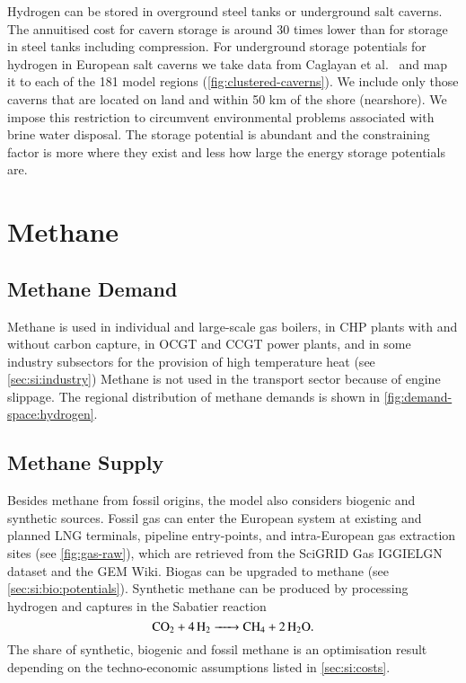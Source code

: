 Hydrogen can be stored in overground steel tanks or underground salt caverns.
The annuitised cost for cavern storage is around 30 times lower than for storage
in steel tanks including compression. For underground storage potentials for
hydrogen in European salt caverns we take data from Caglayan et
al.~ and map it to
each of the 181 model regions (\cref{fig:clustered-caverns}). We include only
those caverns that are located on land and within 50 km of the shore
(nearshore). We impose this restriction to circumvent environmental problems
associated with brine water disposal. The
storage potential is abundant and the constraining factor is more where they
exist and less how large the energy storage potentials are.

\section{Methane}
\label{sec:si:methane}

\subsection{Methane Demand}
\label{sec:si:methane:demand}

Methane is used in individual and large-scale gas boilers, in CHP plants with
and without carbon capture, in OCGT and CCGT power plants, and in some industry
subsectors for the provision of high temperature heat (see
\cref{sec:si:industry}) Methane is not used in the transport sector because of
engine slippage. The regional distribution of methane demands is shown in
\cref{fig:demand-space:hydrogen}. %

\subsection{Methane Supply}
\label{sec:si:methane:supply}

Besides methane from fossil origins, the model also considers biogenic and
synthetic sources. Fossil gas can enter the European system at existing and
planned LNG terminals, pipeline entry-points, and intra-European gas extraction
sites (see \cref{fig:gas-raw}), which are retrieved from the SciGRID Gas
IGGIELGN dataset and the GEM
Wiki. Biogas can be upgraded to methane (see
\cref{sec:si:bio:potentials}). Synthetic methane can be produced by processing
hydrogen and captures \co in the Sabatier reaction
\begin{equation}
    \ce{CO2 + 4H2 -> CH4 + 2H2O}.
\end{equation}
The share of synthetic, biogenic and fossil methane is an optimisation result
depending on the techno-economic assumptions listed in \cref{sec:si:costs}.


